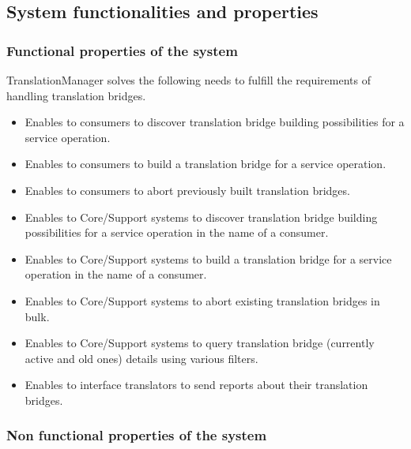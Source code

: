 \documentclass[a4paper]{arrowhead}
\begin{document}
\subsection{System functionalities and properties}
\label{sec:properties}

\subsubsection {Functional properties of the system}
TranslationManager solves the following needs to fulfill the requirements of handling translation bridges.

\begin{itemize}
    \item Enables to consumers to discover translation bridge building possibilities for a service operation.
    \item Enables to consumers to build a translation bridge for a service operation.
    \item Enables to consumers to abort previously built translation bridges.
    \item Enables to Core/Support systems to discover translation bridge building possibilities for a service operation in the name of a consumer.
    \item Enables to Core/Support systems to build a translation bridge for a service operation in the name of a consumer.
    \item Enables to Core/Support systems to abort existing translation bridges in bulk.
    \item Enables to Core/Support systems to query translation bridge (currently active and old ones) details using various filters.
    \item Enables to interface translators to send reports about their translation bridges.
\end{itemize}

\subsubsection {Non functional properties of the system}
\end{document}
